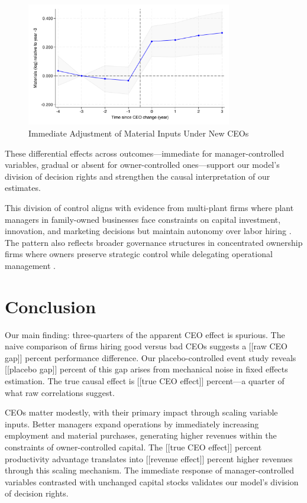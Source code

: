 \documentclass[11pt,a4paper]{article}
\begin{document}
\begin{figure}[htbp]
\centering
\includegraphics[width=0.8\textwidth]{figure/event_study_lnM.pdf}
\caption{Immediate Adjustment of Material Inputs Under New CEOs}
\label{fig:materials}
\end{figure}

These differential effects across outcomes—immediate for manager-controlled variables, gradual or absent for owner-controlled ones—support our model's division of decision rights and strengthen the causal interpretation of our estimates.

This division of control aligns with evidence from multi-plant firms where plant managers in family-owned businesses face constraints on capital investment, innovation, and marketing decisions but maintain autonomy over labor hiring \citep{bloom2012americans}. The pattern also reflects broader governance structures in concentrated ownership firms where owners preserve strategic control while delegating operational management \citep{zellweger2012managing}.

\section{Conclusion}

Our main finding: three-quarters of the apparent CEO effect is spurious. The naive comparison of firms hiring good versus bad CEOs suggests a [[raw CEO gap]] percent performance difference. Our placebo-controlled event study reveals [[placebo gap]] percent of this gap arises from mechanical noise in fixed effects estimation. The true causal effect is [[true CEO effect]] percent—a quarter of what raw correlations suggest.

CEOs matter modestly, with their primary impact through scaling variable inputs. Better managers expand operations by immediately increasing employment and material purchases, generating higher revenues within the constraints of owner-controlled capital. The [[true CEO effect]] percent productivity advantage translates into [[revenue effect]] percent higher revenues through this scaling mechanism. The immediate response of manager-controlled variables contrasted with unchanged capital stocks validates our model's division of decision rights.
\end{document}
